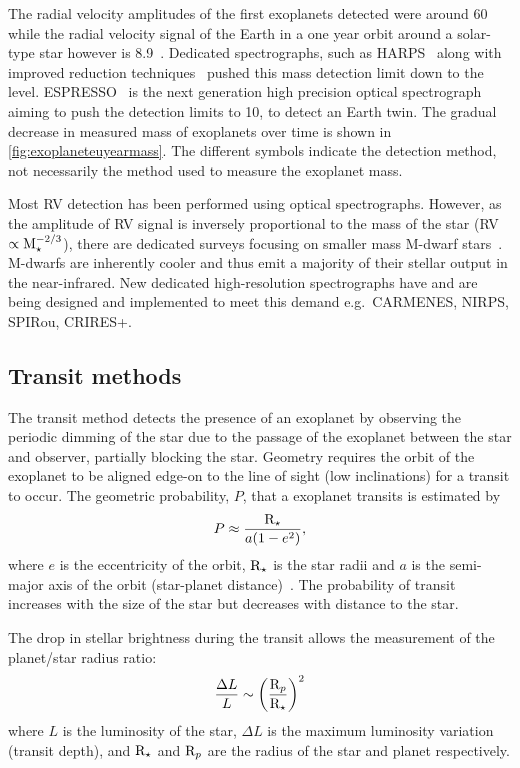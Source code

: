 The radial velocity amplitudes of the first exoplanets detected were around 60\mps{} while
the radial velocity signal of the Earth in a one year orbit around a solar-type star however is 8.9\cmps{}~\citep[e.g.][]{figueira_radial_2010}.
Dedicated spectrographs, such as HARPS~\citep{mayor_setting_2003} along with improved reduction techniques~\citep{lovis_new_2007} pushed this mass detection limit down to the \mps{} level.
ESPRESSO~\citep{pepe_espresso_2014, megevand_espresso_2014} is the next generation high precision optical spectrograph aiming to push the detection limits to 10\cmps, to detect an Earth twin.
The gradual decrease in measured mass of exoplanets over time is shown in \cref{fig:exoplaneteuyearmass}.
The different symbols indicate the detection method, not necessarily the method used to measure the exoplanet mass.

Most {RV} detection has been performed using optical spectrographs.
However, as the amplitude of {RV} signal is inversely proportional to the mass of the star (RV $\propto \textrm{M}_{\star}^{-2/3}$), there are dedicated surveys focusing on smaller mass M-dwarf stars~\citep[e.g.][]{reiners_carmenes_2018}.
M-dwarfs are inherently cooler and thus emit a majority of their stellar output in the near-infrared.
New dedicated high-resolution \nir{} spectrographs have and are being designed and implemented to meet this demand e.g.\ {CARMENES}, {NIRPS}, {SPIRou}, {CRIRES+}.


\subsection{Transit methods}
\label{subsec:transit}
The transit method detects the presence of an exoplanet by observing the periodic dimming of the star due to the passage of the exoplanet between the star and observer, partially blocking the star.
Geometry requires the orbit of the exoplanet to be aligned edge-on to the line of sight (low inclinations) for a transit to occur.
The geometric probability, $P$, that a exoplanet transits is estimated by
\begin{equation}
P \approx \frac{\textrm{R}_{\star}}{a (1-{e}^{2})},
\end{equation}
where \(e\) is the eccentricity of the orbit, $\textrm{R}_{\star}$ is the star radii and \(a\) is the semi-major axis of the orbit (star-planet distance)~\citep[e.g.][]{barnes_effects_2007}.
The probability of transit increases with the size of the star but decreases with distance to the star.

The drop in stellar brightness during the transit allows the measurement of the planet/star radius ratio:
\begin{equation}
    \frac{\Delta L}{L}\sim{\left(\frac{\textrm{R}_{p}}{\textrm{R}_{\star}}\right)}^{2}
\end{equation}
where \(L\) is the luminosity of the star, \(\Delta L\) is the maximum luminosity variation (transit depth), and \(\textrm{R}_{\star}\) and \(\textrm{R}_{p}\) are the radius of the star and planet respectively.

